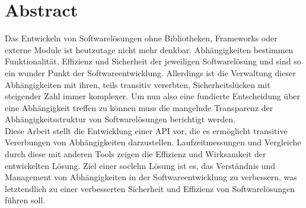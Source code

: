 \section{Abstract} \label{sec:abstract}
Das Entwickeln von Softwarelösungen ohne Bibliotheken, Frameworks oder externe Module ist heutzutage nicht mehr denkbar.
Abhängigkeiten bestimmen Funktionalität, Effizienz und Sicherheit der jeweiligen Softwarelösung und sind so ein wunder Punkt der Softwareentwicklung.
Allerdings ist die Verwaltung dieser Abhängigkeiten mit ihren, teils transitiv vererbten, Sicherheitslücken mit steigender Zahl immer komplexer.
Um nun also eine fundierte Entscheidung über eine Abhängigkeit treffen zu können muss die mangelnde Transparenz der Abhängigkeitsstruktur von Softwarelösungen berichtigt werden.
\\
Diese Arbeit stellt die Entwicklung einer API vor, die es ermöglicht transitive Vererbungen von Abhängigkeiten darzustellen.
Laufzeitmessungen und Vergleiche durch diese mit anderen Tools zeigen die Effizienz und Wirksamkeit der entwickelten Lösung.
Ziel einer soclehn Lösung ist es, das Verständnis und Management von Abhängigkeiten in der Softwareentwicklung zu verbessern, was letztendlich zu einer verbesserten Sicherheit und Effizienz von Softwarelösungen führen soll.